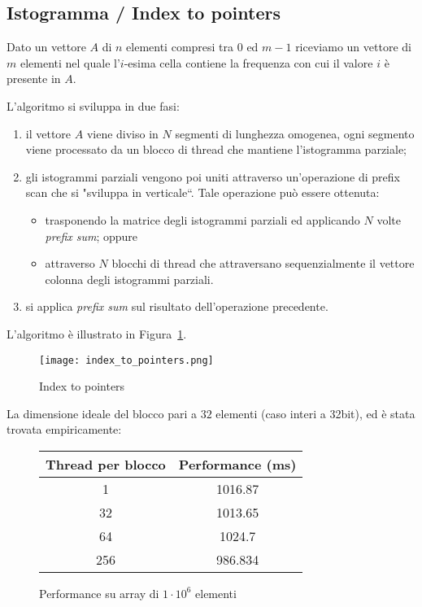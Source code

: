 \subsection{Istogramma / Index to pointers}
\label{idx-to-pnt}
Dato un vettore $A$ di $n$ elementi compresi tra $0$ ed $m-1$ riceviamo un vettore di $m$ elementi nel quale l'$i$-esima cella contiene la frequenza con cui il valore $i$ è presente in $A$. 

L'algoritmo si sviluppa in due fasi:
\begin{enumerate}
    \item il vettore $A$ viene diviso in $N$ segmenti di lunghezza omogenea, ogni segmento viene processato da un blocco di thread che mantiene l'istogramma parziale;
    \item gli istogrammi parziali vengono poi uniti attraverso un'operazione di prefix scan che si "sviluppa in verticale``. Tale operazione può essere ottenuta:
    \begin{itemize}
        \item trasponendo la matrice degli istogrammi parziali ed applicando $N$ volte \emph{prefix sum}; oppure
        \item attraverso $N$ blocchi di thread che attraversano sequenzialmente il vettore colonna degli istogrammi parziali.
    \end{itemize}
    \item si applica \emph{prefix sum} sul risultato dell'operazione precedente.
\end{enumerate}

L'algoritmo è illustrato in Figura~\ref{index_to_pointers}. 

\begin{figure}[t]
    \centering
	\texttt{[image: index\_to\_pointers.png]}
	\caption{Index to pointers}
	\label{index_to_pointers}
\end{figure}


La dimensione ideale del blocco pari a $32$ elementi (caso interi a 32bit), ed è stata trovata empiricamente:
\begin{figure}[H]
	\centering
	\begin{tabular}{SS}
		\toprule
		\textbf{Thread per blocco} & \textbf{Performance (\si{\milli\second})} \\  & 1016.87 \\
		32 & 1013.65 \\
		64 & 1024.7 \\
		256 & 986.834 \\ \bottomrule
	\end{tabular}
	\caption{Performance su array di $1\cdot 10^6$ elementi} %
\end{figure}

